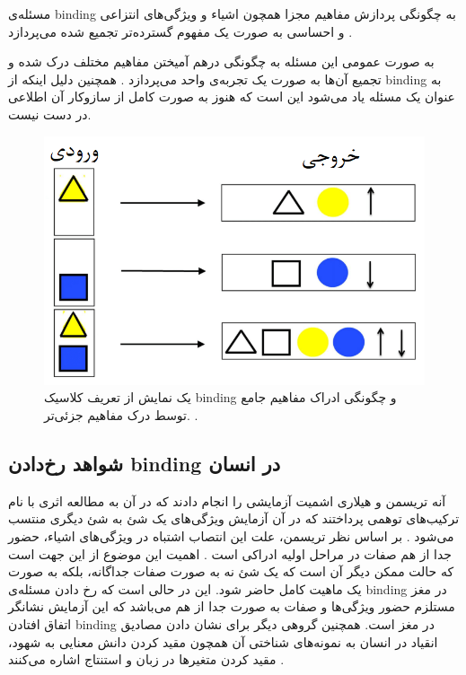 \documentclass[12pt]{report}
\begin{document}
	مسئله‌ی \gls{binding} به چگونگی پردازش مفاهیم مجزا همچون اشیاء و ویژگی‌های انتزاعی و احساسی به صورت یک مفهوم گسترده‌تر تجمیع شده می‌پردازد
	\cite{REVONSUO1999123}.
	
	به صورت عمومی این مسئله به چگونگی در‌هم آمیختن مفاهیم مختلف درک شده و تجمیع آن‌ها به صورت یک تجربه‌ی واحد می‌پردازد
	\cite{Feldman2012}.
	همچنین دلیل اینکه از \gls{binding} به عنوان یک مسئله یاد می‌شود این است که هنوز به صورت کامل از سازوکار آن اطلاعی در دست نیست.
	
	\begin{figure}[H]
		\centering
		\includegraphics[width=0.7\linewidth]{binding.png}
		\caption[NS]{
			یک نمایش از تعریف کلاسیک \gls{binding} و چگونگی ادراک مفاهیم جامع توسط درک مفاهیم جزئی‌تر.
			\cite{velic2012}.
		}
		\label{fig:binding}
	\end{figure}
	
	
	\subsection{شواهد رخ‌دادن \gls{binding} در انسان}
	\label{subsection:binding-in-human}
	
	
	آنه تریسمن
	و هیلاری اشمیت
	آزمایشی را انجام دادند که در آن به مطالعه اثری با نام ترکیب‌های توهمی
	پرداختند که در آن آزمایش ویژگی‌های یک شئ به شئ دیگری منتسب می‌شود
	\cite{TREISMAN1982107}.
	بر اساس نظر تریسمن، علت این انتصاب اشتباه در ویژگی‌های اشیاء، حضور جدا از هم صفات در مراحل اولیه ادراکی است
	\cite{goldstein_2019}.
	اهمیت این موضوع از این جهت است که حالت ممکن دیگر آن است که یک شئ نه به صورت صفات جداگانه، بلکه به صورت یک ماهیت کامل حاضر شود. این در حالی است که رخ دادن مسئله‌ی \gls{binding} در مغز مستلزم حضور ویژگی‌ها و صفات به صورت جدا از هم می‌باشد که این آزمایش نشانگر اتفاق افتادن \gls{binding} در مغز است. همچنین گروهی دیگر برای نشان دادن مصادیق انقیاد در انسان به نمونه‌های شناختی آن همچون مقید کردن دانش معنایی به شهود، مقید کردن متغیر‌ها در زبان و استنتاج اشاره می‌کنند \cite{greff2020binding}.
	
\end{document}
